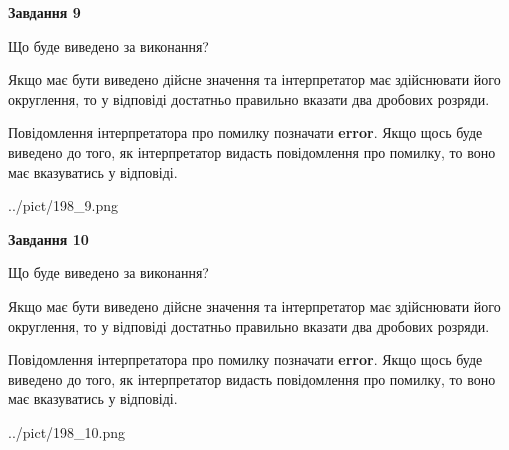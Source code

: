 \documentclass[12pt, ukrainian]{article}
\begin{document}
{\begin {Large}
{\begin {center}\textbf{Завдання 9}\end {center}}\par
Що буде виведено за виконання? \par

Якщо має бути виведено дійсне значення та інтерпретатор має здійснювати його округлення, 
то у відповіді достатньо правильно вказати два дробових розряди.

Повідомлення інтерпретатора про помилку позначати \textbf{error}.
Якщо щось буде виведено до того, як інтерпретатор видасть повідомлення про помилку, 
то воно має вказуватись у відповіді. \par

\begin{center}
	{../pict/198_9.png}
\end{center}
\newpage

{\begin {center}\textbf{Завдання 10}\end {center}}\par
Що буде виведено за виконання? \par

Якщо має бути виведено дійсне значення та інтерпретатор має здійснювати його округлення, 
то у відповіді достатньо правильно вказати два дробових розряди.

Повідомлення інтерпретатора про помилку позначати \textbf{error}.
Якщо щось буде виведено до того, як інтерпретатор видасть повідомлення про помилку, 
то воно має вказуватись у відповіді. \par

\begin{center}
	{../pict/198_10.png}
\end{center}
\newpage

\end {Large}}
\end{document}
